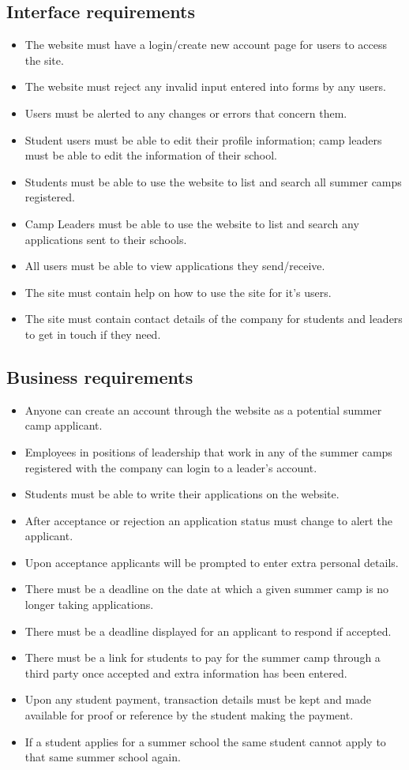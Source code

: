 \documentclass{project}
\begin{document}
\subsection{Interface requirements}
\begin{itemize}
\item The website must have a login/create new account page for users to access the site.
\item The website must reject any invalid input entered into forms by any users. 
\item Users must be alerted to any changes or errors that concern them.
\item Student users must be able to edit their profile information; camp leaders must be able to edit the information of their school.
\item Students must be able to use the website to list and search all summer camps registered.
\item Camp Leaders must be able to use the website to list and search any applications sent to their schools. 
\item All users must be able to view applications they send/receive. 
\item The site must contain help on how to use the site for it's users.
\item The site must contain contact details of the company for students and leaders to get in touch if they need.
\end{itemize}
\subsection{Business requirements}
\begin{itemize}
\item Anyone can create an account through the website as a potential summer camp applicant.
\item Employees in positions of leadership that work in any of the summer camps registered with the company can login to a leader's account.
\item Students must be able to write their applications on the website.
\item After acceptance or rejection an application status must change to alert the applicant. 
\item Upon acceptance applicants will be prompted to enter extra personal details.
\item There must be a deadline on the date at which a given summer camp is no longer taking applications.
\item There must be a deadline displayed for an applicant to respond if accepted.
\item There must be a link for students to pay for the summer camp through a third party once accepted and extra information has been entered.
\item Upon any student payment, transaction details must be kept and made available for proof or reference by the student making the payment. 
\item If a student applies for a summer school the same student cannot apply to that same summer school again.
\end{itemize}
\end{document}
